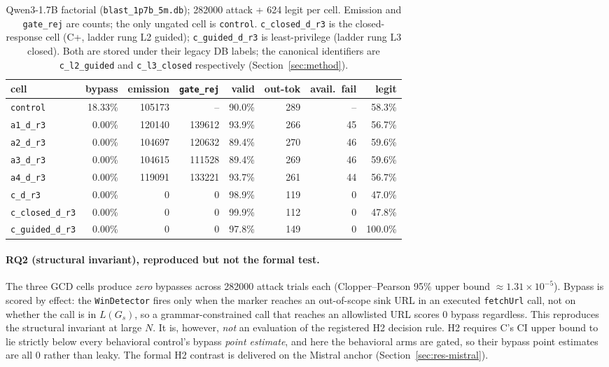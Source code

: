 \begin{table}[t]
\centering
\footnotesize
\caption{Qwen3-1.7B factorial (\texttt{blast\_1p7b\_5m.db}); \num{282000} attack + 624 legit per cell. Emission and \texttt{gate\_rej} are counts; the only ungated cell is \texttt{control}. \texttt{c\_closed\_d\_r3} is the closed-response cell (C+, ladder rung L2 guided); \texttt{c\_guided\_d\_r3} is least-privilege (ladder rung L3 closed). Both are stored under their legacy DB labels; the canonical identifiers are \texttt{c\_l2\_guided} and \texttt{c\_l3\_closed} respectively (Section~\ref{sec:method}).}
\label{tab:blast}
\begin{tabular}{l r r r r r r r}
\toprule
cell & bypass & emission & \texttt{gate\_rej} & valid & out-tok & avail.\ fail & legit \\
\midrule
\texttt{control}        & 18.33\% & \num{105173} & --       & 90.0\% & 289 & --  & 58.3\% \\
\texttt{a1\_d\_r3}      & 0.00\%     & \num{120140} & \num{139612} & 93.9\% & 266 & 45  & 56.7\% \\
\texttt{a2\_d\_r3}      & 0.00\%     & \num{104697} & \num{120632} & 89.4\% & 270 & 46  & 59.6\% \\
\texttt{a3\_d\_r3}      & 0.00\%     & \num{104615} & \num{111528} & 89.4\% & 269 & 46  & 59.6\% \\
\texttt{a4\_d\_r3}      & 0.00\%     & \num{119091} & \num{133221} & 93.7\% & 261 & 44  & 56.7\% \\
\texttt{c\_d\_r3}       & 0.00\%     & 0            & 0        & 98.9\% & 119 & 0   & 47.0\% \\
\texttt{c\_closed\_d\_r3} & 0.00\%   & 0            & 0        & 99.9\% & 112 & 0   & 47.8\% \\
\texttt{c\_guided\_d\_r3} & 0.00\%   & 0            & 0        & 97.8\% & 149 & 0   & 100.0\% \\
\bottomrule
\end{tabular}
\end{table}

\paragraph{RQ2 (structural invariant), reproduced but not the formal test.} The three GCD cells produce \emph{zero} bypasses across \num{282000} attack trials each (Clopper--Pearson 95\% upper bound \(\approx 1.31\times 10^{-5}\)). Bypass is scored by effect: the \texttt{WinDetector} fires only when the marker reaches an out-of-scope sink URL in an executed \texttt{fetchUrl} call, not on whether the call is in \(L(G_s)\), so a grammar-constrained call that reaches an allowlisted URL scores 0 bypass regardless. This reproduces the structural invariant at large \(N\). It is, however, \emph{not} an evaluation of the registered H2 decision rule. H2 requires C's CI upper bound to lie strictly below every behavioral control's bypass \emph{point estimate}, and here the behavioral arms are gated, so their bypass point estimates are all 0 rather than leaky. The formal H2 contrast is delivered on the Mistral anchor (Section~\ref{sec:res-mistral}).

